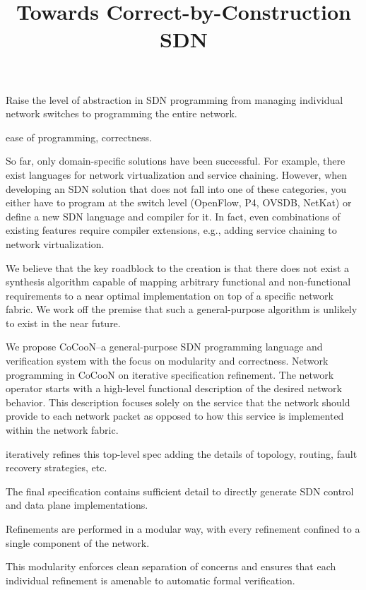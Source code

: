 \documentclass[letterpaper,10pt,twocolumn]{article}
\begin{document}
\title{Towards Correct-by-Construction SDN}

\author{}

\date{}
\maketitle

Raise the level of abstraction in SDN programming from managing 
individual network switches to programming the entire network.

ease of programming, correctness.

So far, only domain-specific solutions have been successful.  For 
example, there exist languages for network virtualization and 
service chaining.  However, when developing an SDN solution that 
does not fall into one of these categories, you either have to 
program at the switch level (OpenFlow, P4, OVSDB, NetKat) or 
define a new SDN language and compiler for it.  In fact, even 
combinations of existing features require compiler extensions, 
e.g., adding service chaining to network virtualization.

We believe that the key roadblock to the creation is that there 
does not exist a synthesis algorithm capable of mapping arbitrary 
functional and non-functional requirements to a near optimal 
implementation on top of a specific network fabric.  We work off 
the premise that such a general-purpose algorithm is unlikely to 
exist in the near future.

We propose CoCooN--a general-purpose SDN programming language and 
verification system with the focus on modularity and correctness.  
Network programming in CoCooN on iterative specification 
refinement.  The network operator starts with a high-level 
functional description of the desired network behavior.  This 
description focuses solely on the service that the network should 
provide to each network packet as opposed to how this service is 
implemented within the network fabric.  

iteratively refines this top-level spec adding the details of
topology, routing, fault recovery strategies, etc. 

The final specification contains sufficient detail to directly 
generate SDN control and data plane implementations.

Refinements are performed in a modular way, with every refinement 
confined to a single component of the network. 

This modularity enforces clean separation of concerns and ensures 
that each individual refinement is amenable to automatic formal 
verification.
\end{document}
